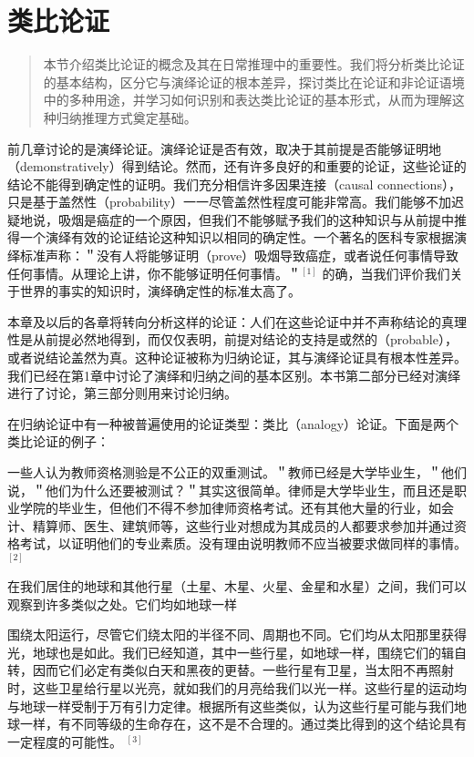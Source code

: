 \section{类比论证}

\begin{quotation}
本节介绍类比论证的概念及其在日常推理中的重要性。我们将分析类比论证的基本结构，区分它与演绎论证的根本差异，探讨类比在论证和非论证语境中的多种用途，并学习如何识别和表达类比论证的基本形式，从而为理解这种归纳推理方式奠定基础。
\end{quotation}

前几章讨论的是演绎论证。演绎论证是否有效，取决于其前提是否能够证明地（demonstratively）得到结论。然而，还有许多良好的和重要的论证，这些论证的结论不能得到确定性的证明。我们充分相信许多因果连接（causal connections），只是基于盖然性（probability）一一尽管盖然性程度可能非常高。我们能够不加迟疑地说，吸烟是癌症的一个原因，但我们不能够赋予我们的这种知识与从前提中推得一个演绎有效的论证结论这种知识以相同的确定性。一个著名的医科专家根据演绎标准声称：＂没有人将能够证明（prove）吸烟导致癌症，或者说任何事情导致任何事情。从理论上讲，你不能够证明任何事情。＂${ }^{[1]}$ 的确，当我们评价我们关于世界的事实的知识时，演绎确定性的标准太高了。

本章及以后的各章将转向分析这样的论证：人们在这些论证中并不声称结论的真理性是从前提必然地得到，而仅仅表明，前提对结论的支持是或然的（probable），或者说结论盖然为真。这种论证被称为归纳论证，其与演绎论证具有根本性差异。我们已经在第1章中讨论了演绎和归纳之间的基本区别。本书第二部分已经对演绎进行了讨论，第三部分则用来讨论归纳。

在归纳论证中有一种被普遍使用的论证类型：类比（analogy）论证。下面是两个类比论证的例子：

一些人认为教师资格测验是不公正的双重测试。＂教师已经是大学毕业生，＂他们说，＂他们为什么还要被测试？＂其实这很简单。律师是大学毕业生，而且还是职业学院的毕业生，但他们不得不参加律师资格考试。还有其他大量的行业，如会计、精算师、医生、建筑师等，这些行业对想成为其成员的人都要求参加并通过资格考试，以证明他们的专业素质。没有理由说明教师不应当被要求做同样的事情。 ${ }^{[2]}$

在我们居住的地球和其他行星（土星、木星、火星、金星和水星）之间，我们可以观察到许多类似之处。它们均如地球一样

围绕太阳运行，尽管它们绕太阳的半径不同、周期也不同。它们均从太阳那里获得光，地球也是如此。我们已经知道，其中一些行星，如地球一样，围绕它们的辑自转，因而它们必定有类似白天和黑夜的更替。一些行星有卫星，当太阳不再照射时，这些卫星给行星以光亮，就如我们的月亮给我们以光一样。这些行星的运动均与地球一样受制于万有引力定律。根据所有这些类似，认为这些行星可能与我们地球一样，有不同等级的生命存在，这不是不合理的。通过类比得到的这个结论具有一定程度的可能性。 ${ }^{[3]}$

